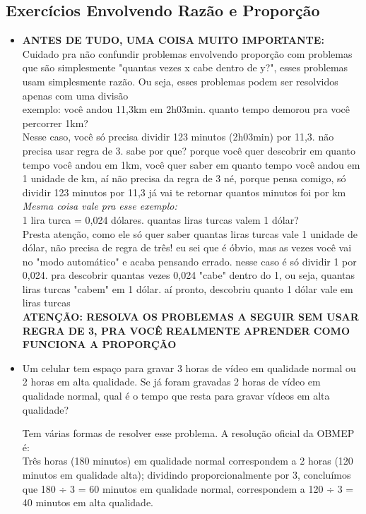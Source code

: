 \documentclass{article}
\begin{document}
\subsection{Exercícios Envolvendo Razão e Proporção}

\begin{itemize}
    
    \item \textbf{ANTES DE TUDO, UMA COISA MUITO IMPORTANTE:} Cuidado pra não confundir problemas envolvendo proporção com problemas que são simplesmente "quantas vezes x cabe dentro de y?", esses problemas usam simplesmente razão. Ou seja, esses problemas podem ser resolvidos apenas com uma divisão
    \\[5pt]
    exemplo: você andou 11,3km em 2h03min. quanto tempo demorou pra você percorrer 1km? 
    \\[5pt]
    Nesse caso, você só precisa dividir 123 minutos (2h03min) por 11,3. não precisa usar regra de 3. sabe por que? porque você quer descobrir em quanto tempo você andou em 1km, você quer saber em quanto tempo você andou em 1 unidade de km, aí não precisa da regra de 3 né, porque pensa comigo, só dividir 123 minutos por 11,3 já vai te retornar quantos minutos foi por km
    \\[5pt]
    \textit{Mesma coisa vale pra esse exemplo:}
    \\[5pt]
    1 lira turca = 0,024 dólares. quantas liras turcas valem 1 dólar?
    \\[5pt]
    Presta atenção, como ele só quer saber quantas liras turcas vale 1 unidade de dólar, não precisa de regra de três! eu sei que é óbvio, mas as vezes você vai no "modo automático" e acaba pensando errado. nesse caso é só dividir 1 por 0,024. pra descobrir quantas vezes 0,024 "cabe" dentro do 1, ou seja, quantas liras turcas "cabem" em 1 dólar. aí pronto, descobriu quanto 1 dólar vale em liras turcas
    \\[5pt]
    \textbf{ATENÇÃO: RESOLVA OS PROBLEMAS A SEGUIR SEM USAR REGRA DE 3, PRA VOCÊ REALMENTE APRENDER COMO FUNCIONA A PROPORÇÃO}

    \item Um celular tem espaço para gravar 3 horas de vídeo em qualidade normal ou 2 horas em alta qualidade. Se já foram gravadas 2 horas de vídeo em qualidade normal, qual é o tempo que resta para gravar vídeos em alta qualidade?

    Tem várias formas de resolver esse problema. A resolução oficial da OBMEP é:
    \\[5pt]
    Três horas (180 minutos) em qualidade normal correspondem a 2 horas (120 minutos em qualidade alta); dividindo proporcionalmente por 3, concluímos que 180 ÷ 3 = 60 minutos em qualidade normal, correspondem a 120 ÷ 3 = 40 minutos em alta qualidade.


\end{itemize}
\end{document}
